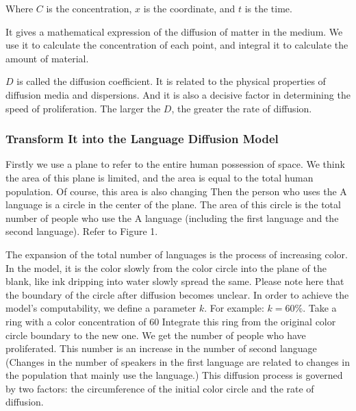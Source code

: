\documentclass{mcmthesis}
\begin{document}
    Where $C$ is the concentration, $x$ is the coordinate, and $t$ is the time.

    It gives a mathematical expression of the diffusion of matter in the medium.
    We use it to calculate the concentration of each point,
    and integral it to calculate the amount of material.

    $D$ is called the diffusion coefficient.
    It is related to the physical properties of diffusion media and dispersions.
    And it is also a decisive factor in determining the speed of proliferation.
    The larger the $D$, the greater the rate of diffusion.
    \subsubsection{Transform It into the Language Diffusion Model}%

    Firstly we use a plane to refer to the entire human possession of space.
    We think the area of this plane is limited, and the area is equal to the total human population.
    Of course, this area is also changing
    Then the person who uses the A language is a circle in the center of the plane.
    The area of this circle is the total number of people who use the A language (including the first language and the second language).
    Refer to Figure 1.

    The expansion of the total number of languages is the process of increasing color.
    In the model, it is the color slowly from the color circle into the plane of the blank, like ink dripping into water slowly spread the same.
    Please note here that the boundary of the circle after diffusion becomes unclear.
    In order to achieve the model's computability, we define a parameter $k$.
    For example: $k=60\%$.
    Take a ring with a color concentration of 60%
    Integrate this ring from the original color circle boundary to the new one.
    We get the number of people who have proliferated.
    This number is an increase in the number of second language
    (Changes in the number of speakers in the first language are related to changes in the population that mainly use the language.)
    This diffusion process is governed by two factors: the circumference of the initial color circle and the rate of diffusion.
\end{document}
